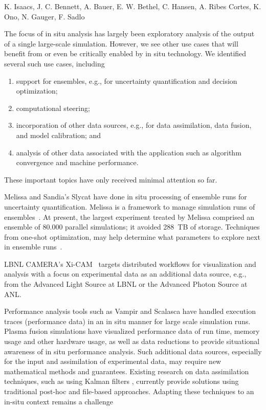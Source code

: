 \license

 K. Isaacs, J. C. Bennett, A. Bauer, E. W. Bethel, C. Hansen, A. Ribes Cortes, K. Ono, N. Gauger, F. Sadlo

\begin{refsection}

The focus of in situ analysis has largely been exploratory analysis of the output of a single large-scale simulation. 
However, we see other use cases that will benefit from or even be critically enabled by in situ technology. 
We identified several such use cases, including 
\begin{enumerate}
    \item support for ensembles, e.g., for uncertainty quantification and decision optimization;
    \item computational steering;
    \item  incorporation of other data sources, e.g., for data assimilation, data fusion, and model calibration; and
    \item analysis of other data associated with the application such as algorithm convergence and machine performance. 
\end{enumerate}
These important topics have only received minimal attention so far. 

Melissa and Sandia’s Slycat have done in situ processing of ensemble runs for uncertainty quantification.
Melissa is a framework to manage simulation runs of ensembles~\cite{Terraz17}. 
At present, the largest experiment treated by Melissa comprised an ensemble of 80.000 parallel simulations; it avoided 288~TB of storage.
Techniques from one-shot optimization, may help determine what parameters to explore next in ensemble runs~\cite{Gunther15}.

LBNL CAMERA's Xi-CAM~\cite{Pandolfi18} targets distributed workflows for visualization and analysis with a focus on experimental data as an additional data source, e.g., from the Advanced Light Source at LBNL or the Advanced Photon Source at ANL. 

Performance analysis tools such as Vampir and Scalasca have handled execution traces (performance data) in an in situ manner for large scale simulation runs. Plasma fusion simulations have visualized performance data of run time, memory usage and other hardware usage, as well as data reductions to provide situational awareness of in situ performance analysis.
Such additional data sources, especially for the input and assimilation of experimental data, may require new mathematical methods and guarantees.
Existing research on data assimilation techniques, such as using Kalman filters \cite{Eversen09}, currently provide solutions using traditional post-hoc and file-based approaches. Adapting these techniques to an in-situ context remains a challenge


\end{refsection}
